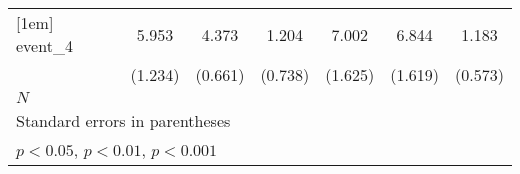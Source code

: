 {\begin{tabular}{l*{6}{c}}
[1em]
event\_4     &       5.953\sym{***}&       4.373\sym{***}&       1.204         &       7.002\sym{***}&       6.844\sym{***}&       1.183\sym{*}  \\
            &     (1.234)         &     (0.661)         &     (0.738)         &     (1.625)         &     (1.619)         &     (0.573)         \\
\hline
\(N\)       &                     &                     &                     &                     &                     &                     \\
\hline\hline
\multicolumn{7}{l}{\footnotesize Standard errors in parentheses}\\
\multicolumn{7}{l}{\footnotesize \sym{*} \(p<0.05\), \sym{**} \(p<0.01\), \sym{***} \(p<0.001\)}\\
\end{tabular}
}
